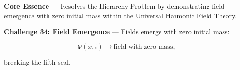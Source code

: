 
\textbf{Core Essence} --- Resolves the Hierarchy Problem by demonstrating field emergence with zero initial mass within the Universal Harmonic Field Theory.

\textbf{Challenge 34: Field Emergence} --- Fields emerge with zero initial mass:

$$
\Phi(x, t) \rightarrow \text{field with zero mass,}
$$

breaking the fifth seal.


